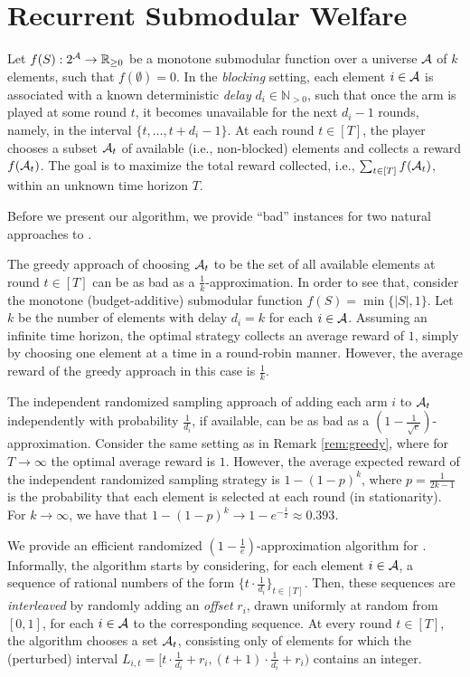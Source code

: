 \section{Recurrent Submodular Welfare}
Let $f(S): 2^{\operatorname{\mathcal{A}}} \rightarrow \mathbb{R}_{\geq 0}$ be a monotone submodular function over a universe $\operatorname{\mathcal{A}}$ of $k$ elements, such that $f(\emptyset) = 0$. In the {\em blocking} setting, each element $i \in \operatorname{\mathcal{A}}$ is associated with a known deterministic {\em delay} $d_i \in \mathbb{N}_{>0}$, such that once the arm is played at some round $t$, it becomes unavailable for the next $d_i-1$ rounds, namely, in the interval $\{t, \dots, t+d_i-1\}$. At each round $t \in [T]$, the player chooses a subset $\operatorname{\mathcal{A}}_t$ of available (i.e., non-blocked) elements and collects a reward $f(\operatorname{\mathcal{A}}_t)$. The goal is to maximize the total reward collected, i.e., $\sum_{t \in [T]} f(\operatorname{\mathcal{A}}_t)$, within an unknown time horizon $T$. 

Before we present our algorithm, we provide ``bad'' instances for two natural approaches to \rsm.

\begin{remark} \label{rem:greedy}
The greedy approach of choosing $\operatorname{\mathcal{A}}_t$ to be the set of all available elements at round $t \in [T]$ can be as bad as a $\frac{1}{k}$-approximation. In order to see that, consider the monotone (budget-additive) submodular function $f(S) = \min\{|S|, 1\}$. Let $k$ be the number of elements with delay $d_i = k$ for each $i \in \operatorname{\mathcal{A}}$. Assuming an infinite time horizon, the optimal strategy collects an average reward of $1$, simply by choosing one element at a time in a round-robin manner. However, the average reward of the greedy approach in this case is $\frac{1}{k}$.
\end{remark}

\begin{remark}
The independent randomized sampling approach of adding each arm $i$ to $\operatorname{\mathcal{A}}_t$ independently with probability $\frac{1}{d_i}$, if available, can be as bad as a $(1 - \frac{1}{\sqrt{e}} )$-approximation. Consider the same setting as in Remark \ref{rem:greedy}, where for $T \to \infty$ the optimal average reward is $1$. However, the average expected reward of the independent randomized sampling strategy is $1 - (1 - p)^k$, where $p = \frac{1}{2k-1}$ is the probability that each element is selected at each round (in stationarity). For $k \to \infty$, we have that $1 - (1 - p)^k \to 1- e^{-\frac{1}{2}} \approx 0.393$.

\end{remark}
We provide an efficient randomized $\left(1-\frac{1}{e}\right)$-approximation algorithm for \rsm. Informally, the algorithm starts by considering, for each element $i \in \operatorname{\mathcal{A}}$, a sequence of rational numbers of the form $\{t\cdot \frac{1}{d_i}\}_{t \in [T]}$. Then, these sequences are {\em interleaved} by randomly adding an {\em offset} $r_i$, drawn uniformly at random from $[0,1]$, for each $i \in \operatorname{\mathcal{A}}$ to the corresponding sequence. At every round $t \in [T]$, the algorithm chooses a set $\operatorname{\mathcal{A}}_t$, consisting only of elements for which the (perturbed) interval $L_{i,t} = [t\cdot \frac{1}{d_i}+ r_i, (t+1)\cdot \frac{1}{d_i}+ r_i )$ contains an integer.


